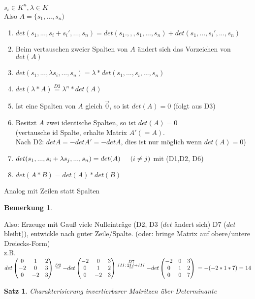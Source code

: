 \documentclass[a4paper,11pt]{article}
\newtheorem{satz}[definition]{Satz}
\newtheorem{bem}[definition]{Bemerkung}
\begin{document}
$s_i\in K^n, \lambda\in K$ \\
Also $A=\{s_1,...,s_n)$
\begin{enumerate}[label=(D\arabic*)]
\item $det(s_1,...,s_i+s_i\prime,...,s_n)=det(s_1.,,,s_1,...,s_n)+det(s_1,...,s_i\prime,...,s_n)$
\item Beim vertauschen zweier Spalten von $A$ ändert sich das Vorzeichen von $det(A)$
\item $det(s_1,...,\lambda s_i,...,s_n)=\lambda*det(s_1,...,s_i,...,s_n)$
\item $det(\lambda*A)\overset{D3}{=}\lambda^n*det(A)$
\item Ist eine Spalten von $A$ gleich $\overset{\rightarrow}{0}$, so ist $det(A)=0$ (folgt aus D3)
\item Besitzt $A$ zwei identische Spalten, so ist $det(A)=0$ \\
(vertausche id Spalte, erhalte Matrix $A\prime(=A)$. \\
Nach D2:  $detA=-detA\prime=-detA$, dies ist nur möglich wenn $det(A)=0$)
\item $det(s_1,...,s_i+\lambda s_j,...,s_n)=det(A)\hspace{5mm}(i\neq j)$ mit (D1,D2, D6) 
\item $det(A*B)=det(A)*det(B)$
\end{enumerate}
Analog mit Zeilen statt Spalten
\newpage
\begin{bem}
\end{bem}
Also: Erzeuge mit Gauß viele Nulleinträge (D2, D3 ($det$ ändert sich) D7 ($det$ bleibt)), entwickle nach guter Zeile/Spalte. (oder: bringe Matrix auf obere/untere Dreiecks-Form) \\
z.B. $det\begin{pmatrix}0&1&2\\-2&0&3\\0&-2&3\end{pmatrix}\overset{D2}{=}-det\begin{pmatrix}-2&0&3\\0&1&2\\0&-2&3\end{pmatrix}\overset{\substack{D7\\III:\:2II+III}}{=}-det\begin{pmatrix}-2&0&3\\0&1&2\\0&0&7\end{pmatrix} \\
=-(-2*1*7)=14$
\begin{satz}
Charakterisierung invertierbarer Matritzen über Determinante
\end{satz}
\end{document}
